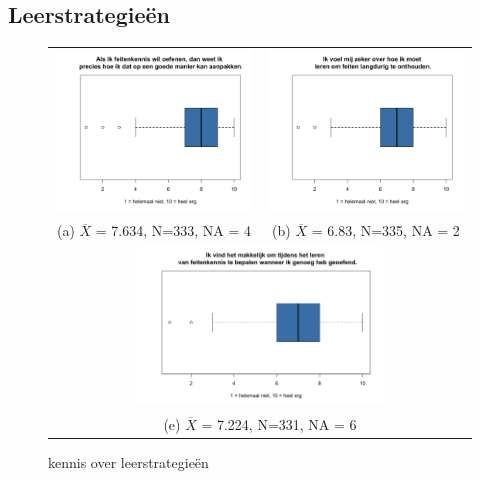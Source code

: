\documentclass[12pt, a4paper]{article}
\begin{document}
\subsection{Leerstrategieën}
\begin{figure}
    \begin{tabular}{cc}
      \includegraphics[width=65mm]{04-WeetAanpakken.png} &   \includegraphics[width=65mm]{06-zekerOverOnthouden.png} \\
    (a)  $\overline{X}$ = 7.634, N=333, NA = 4 & (b) $\overline{X}$ =  6.83, N=335, NA = 2 \\[6pt]
    \multicolumn{2}{c}{\includegraphics[width=65mm]{05-bepalenGenoegGeoefend.png} }\\
    \multicolumn{2}{c}{(e) $\overline{X}$ = 7.224, N=331, NA = 6}
    \end{tabular}
    \caption{kennis over leerstrategieën}
    \label{fig:leerstrategie}
    \end{figure}
\end{document}
